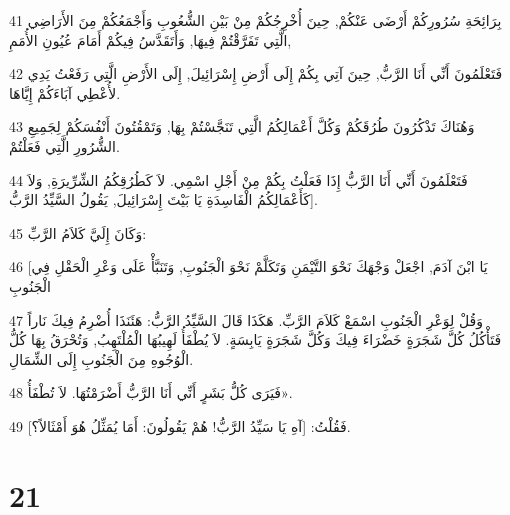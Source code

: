 \par 41 بِرَائِحَةِ سُرُورِكُمْ أَرْضَى عَنْكُمْ, حِينَ أُخْرِجُكُمْ مِنْ بَيْنِ الشُّعُوبِ وَأَجْمَعُكُمْ مِنَ الأَرَاضِي الَّتِي تَفَرَّقْتُمْ فِيهَا, وَأَتَقَدَّسُ فِيكُمْ أَمَامَ عُيُونِ الأُمَمِ,
\par 42 فَتَعْلَمُونَ أَنِّي أَنَا الرَّبُّ, حِينَ آتِي بِكُمْ إِلَى أَرْضِ إِسْرَائِيلَ, إِلَى الأَرْضِ الَّتِي رَفَعْتُ يَدِي لأُعْطِي آبَاءَكُمْ إِيَّاهَا.
\par 43 وَهُنَاكَ تَذْكُرُونَ طُرُقَكُمْ وَكُلَّ أَعْمَالِكُمُ الَّتِي تَنَجَّسْتُمْ بِهَا, وَتَمْقُتُونَ أَنْفُسَكُمْ لِجَمِيعِ الشُّرُورِ الَّتِي فَعَلْتُمْ.
\par 44 فَتَعْلَمُونَ أَنِّي أَنَا الرَّبُّ إِذَا فَعَلْتُ بِكُمْ مِنْ أَجْلِ اسْمِي. لاَ كَطُرُقِكُمُ الشِّرِّيرَةِ, وَلاَ كَأَعْمَالِكُمُ الْفَاسِدَةِ يَا بَيْتَ إِسْرَائِيلَ, يَقُولُ السَّيِّدُ الرَّبُّ].
\par 45 وَكَانَ إِلَيَّ كَلاَمُ الرَّبِّ:
\par 46 [يَا ابْنَ آدَمَ, اجْعَلْ وَجْهَكَ نَحْوَ التَّيْمَنِ وَتَكَلَّمْ نَحْوَ الْجَنُوبِ, وَتَنَبَّأْ عَلَى وَعْرِ الْحَقْلِ فِي الْجَنُوبِ
\par 47 وَقُلْ لِوَعْرِ الْجَنُوبِ اسْمَعْ كَلاَمَ الرَّبِّ. هَكَذَا قَالَ السَّيِّدُ الرَّبُّ: هَئَنَذَا أُضْرِمُ فِيكَ نَاراً فَتَأْكُلُ كُلَّ شَجَرَةٍ خَضْرَاءَ فِيكَ وَكُلَّ شَجَرَةٍ يَابِسَةٍ. لاَ يُطْفَأُ لَهِيبُهَا الْمُلْتَهِبُ, وَتُحْرَقُ بِهَا كُلُّ الْوُجُوهِ مِنَ الْجَنُوبِ إِلَى الشِّمَالِ.
\par 48 فَيَرَى كُلُّ بَشَرٍ أَنِّي أَنَا الرَّبُّ أَضْرَمْتُهَا. لاَ تُطْفَأُ».
\par 49 فَقُلْتُ: [آهِ يَا سَيِّدُ الرَّبُّ! هُمْ يَقُولُونَ: أَمَا يُمَثِّلُ هُوَ أَمْثَالاً؟].

\chapter{21}

